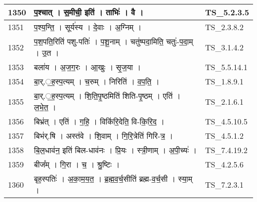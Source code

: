 \documentclass[17pt]{extarticle}
\begin{document}
\begin{longtable}{||p{0.4in}||p{4.9in}||p{0.9in}||}
    \hline
        
    1350 & प॒श्चात्   ।   स॒मीची॒ इति॑   ।   ताभिः॑   ।   वै   ।    & TS\_5.2.3.5       \\
    
    \hline
        
    1351 & प॒श्य॒न्ति॒   ।   सूर्य॑स्य   ।   दे॒वाः   ।   अ॒ग्निम्   ।    & TS\_2.3.8.2       \\
    
    \hline
        
    1352 & प॒श॒पति॒रिति॑ पशु{-}पतिः॑   ।   प॒शू॒नाम्   ।   चतु॑ष्पदा॒मिति॒ चतुः॑{-}प॒दा॒म्   ।   उ॒त   ।    & TS\_3.1.4.2       \\
    
    \hline
        
    1353 & बला॑य   ।   अ॒ज॒ग॒रः   ।   आ॒खुः   ।   सृ॒ज॒या   ।    & TS\_5.5.14.1       \\
    
    \hline
        
    1354 & बा॒र्.॒ह॒स्प॒त्यम्   ।   च॒रुम्   ।   निरिति॑   ।   व॒प॒ति॒   ।    & TS\_1.8.9.1       \\
    
    \hline
        
    1355 & बा॒र्.॒ह॒स्प॒त्यम्   ।   शि॒ति॒पृ॒ष्ठमिति॑ शिति{-}पृ॒ष्ठम्   ।   एति॑   ।   ल॒भे॒त॒   ।    & TS\_2.1.6.1       \\
    
    \hline
        
    1356 & बिभ्र॑त्   ।   एति॑   ।   ग॒हि॒   ।   विकि॑रि॒देति॒ वि{-}कि॒रि॒द॒   ।    & TS\_4.5.10.5       \\
    
    \hline
        
    1357 & बिभ॑र्.षि   ।   अस्त॑वे   ।   शि॒वाम्   ।   गि॒रि॒त्रेति॑ गिरि{-}त्र॒   ।    & TS\_4.5.1.2       \\
    
    \hline
        
    1358 & बि॒ल॒धाव॑न॒ इति॑ बिल{-}धाव॑नः   ।   प्रि॒यः   ।   स्त्री॒णाम्   ।   अ॒पी॒च्यः॑   ।    & TS\_7.4.19.2       \\
    
    \hline
        
    1359 & बीज᳚म्   ।   गि॒रा   ।   च॒   ।   श्रु॒ष्टिः   ।    & TS\_4.2.5.6       \\
    
    \hline
        
    1360 & बृह॒स्पतिः॑   ।   अ॒का॒म॒य॒त॒   ।   ब्र॒ह्म॒व॒र्च॒सीति॑ ब्रह्म{-}व॒र्च॒सी   ।   स्या॒म्   ।    & TS\_7.2.3.1       \\
    

\end{longtable}
\end{document}
